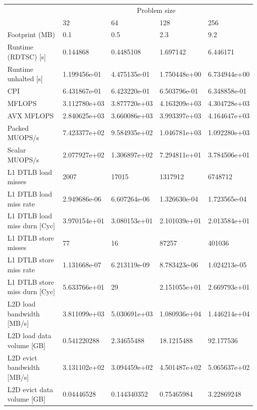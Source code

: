 \documentclass[12pt]{article}
\begin{document}
\begin{table}
\begin{tabular}{l|l|l|l|l}
\hline
\hline
               & \multicolumn{4}{c}{Problem size} \\
               & 32     &    64        &    128       &   256 \\
\hline
Footprint (MB) & 0.1 & 0.5          & 2.3          & 9.2 \\
\hline
Runtime (RDTSC) [s]   & 0.144868 &  0.4485108   &   1.697142   &   6.446171  \\
Runtime unhalted [s]  & 1.199456e-01 & 4.475135e-01 & 1.750448e+00 &   6.734944e+00 \\
CPI                   & 6.431867e-01 & 6.423220e-01 & 6.503796e-01 &   6.348858e-01 \\
\hline
MFLOPS           & 3.112780e+03 & 3.877720e+03  & 4.163209e+03 & 4.304728e+03 \\
AVX MFLOPS       & 2.840625e+03 & 3.660086e+03  & 3.993397e+03 & 4.164647e+03 \\
Packed MUOPS/s   & 7.423377e+02 & 9.584935e+02  & 1.046781e+03 & 1.092280e+03 \\
Scalar MUOPS/s   & 2.077927e+02 & 1.306897e+02  & 7.294811e+01 & 3.784506e+01 \\
\hline
L1 DTLB load misses          &      2007     &      17015   &    1317912   &    6748712   \\
L1 DTLB load miss rate       &  2.949686e-06 &  6.607264e-06& 1.326630e-04 & 1.723565e-04 \\
L1 DTLB load miss durn [Cyc] &  3.970154e+01 &  3.080153e+01& 2.101039e+01 & 2.013584e+01 \\
L1 DTLB store misses         &       77      &       16     &     87257    &    401036    \\
L1 DTLB store miss rate      &  1.131668e-07 &  6.213119e-09& 8.783423e-06 & 1.024213e-05 \\
L1 DTLB store miss durn [Cyc]&  5.633766e+01 &       29     & 2.151055e+01 & 2.669793e+01 \\
\hline
L2D load bandwidth [MB/s]  &  3.811099e+03 &  5.030691e+03 & 1.080936e+04 & 1.446214e+04 \\
L2D load data volume [GB]  &   0.541220288 &   2.34655488  &  18.1215488  &   92.177536  \\
L2D evict bandwidth [MB/s] &  3.131102e+02 &  3.094459e+02 & 4.501487e+02 & 5.065637e+02 \\
L2D evict data volume [GB] &   0.04446528  &   0.144340352 &  0.75465984  &  3.22869248  \\

\end{tabular}
\end{table}
\end{document}
